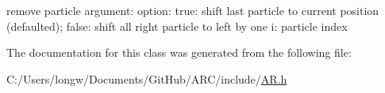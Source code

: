 remove particle argument\+: option\+: true\+: shift last particle to current position (defaulted); false\+: shift all right particle to left by one i\+: particle index 



The documentation for this class was generated from the following file\+:\begin{DoxyCompactItemize}
\item 
C\+:/\+Users/longw/\+Documents/\+Git\+Hub/\+A\+R\+C/include/\hyperlink{AR_8h}{A\+R.\+h}\end{DoxyCompactItemize}
